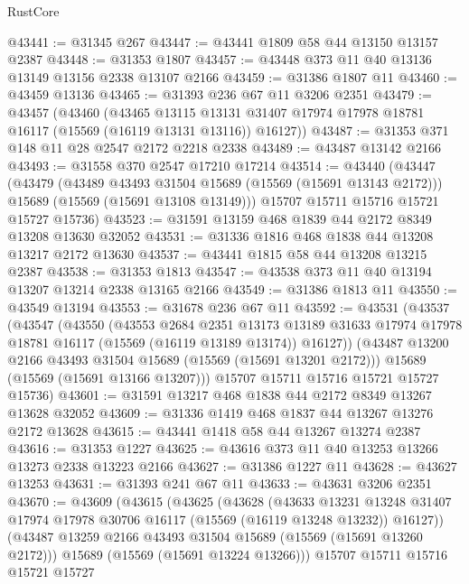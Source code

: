 \begin{lexlean}{RustCore}
\begin{coremodule}
@43441 := @31345 @267
@43447 := @43441 @1809 @58 @44 @13150 @13157 @2387
@43448 := @31353 @1807
@43457 := @43448 @373 @11 @40 @13136 @13149 @13156 @2338 @13107 @2166
@43459 := @31386 @1807 @11
@43460 := @43459 @13136
@43465 := @31393 @236 @67 @11 @3206 @2351
@43479 := @43457
    (@43460
      (@43465
        @13115
        @13131
        @31407
        @17974
        @17978
        @18781
        @16117
        (@15569 (@16119 @13131 @13116))
        @16127))
@43487 := @31353 @371 @148 @11 @28 @2547 @2172 @2218 @2338
@43489 := @43487 @13142 @2166
@43493 := @31558 @370 @2547 @17210 @17214
@43514 := @43440
    (@43447
      (@43479
        (@43489 @43493 @31504 @15689 (@15569 (@15691 @13143 @2172)))
        @15689
        (@15569 (@15691 @13108 @13149)))
      @15707
      @15711
      @15716
      @15721
      @15727
      @15736)
@43523 := @31591 @13159 @468 @1839 @44 @2172 @8349 @13208 @13630 @32052
@43531 := @31336 @1816 @468 @1838 @44 @13208 @13217 @2172 @13630
@43537 := @43441 @1815 @58 @44 @13208 @13215 @2387
@43538 := @31353 @1813
@43547 := @43538 @373 @11 @40 @13194 @13207 @13214 @2338 @13165 @2166
@43549 := @31386 @1813 @11
@43550 := @43549 @13194
@43553 := @31678 @236 @67 @11
@43592 := @43531
    (@43537
      (@43547
        (@43550
          (@43553
            @2684
            @2351
            @13173
            @13189
            @31633
            @17974
            @17978
            @18781
            @16117
            (@15569 (@16119 @13189 @13174))
            @16127))
        (@43487 @13200 @2166 @43493 @31504 @15689 (@15569 (@15691 @13201 @2172)))
        @15689
        (@15569 (@15691 @13166 @13207)))
      @15707
      @15711
      @15716
      @15721
      @15727
      @15736)
@43601 := @31591 @13217 @468 @1838 @44 @2172 @8349 @13267 @13628 @32052
@43609 := @31336 @1419 @468 @1837 @44 @13267 @13276 @2172 @13628
@43615 := @43441 @1418 @58 @44 @13267 @13274 @2387
@43616 := @31353 @1227
@43625 := @43616 @373 @11 @40 @13253 @13266 @13273 @2338 @13223 @2166
@43627 := @31386 @1227 @11
@43628 := @43627 @13253
@43631 := @31393 @241 @67 @11
@43633 := @43631 @3206 @2351
@43670 := @43609
    (@43615
      (@43625
        (@43628
          (@43633
            @13231
            @13248
            @31407
            @17974
            @17978
            @30706
            @16117
            (@15569 (@16119 @13248 @13232))
            @16127))
        (@43487 @13259 @2166 @43493 @31504 @15689 (@15569 (@15691 @13260 @2172)))
        @15689
        (@15569 (@15691 @13224 @13266)))
      @15707
      @15711
      @15716
      @15721
      @15727

\end{coremodule}
\end{lexlean}

